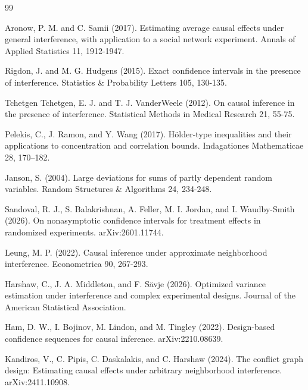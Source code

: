 \documentclass{article}
\begin{document}
\begin{thebibliography}{99}

   Aronow, P. M. and C. Samii (2017). Estimating average causal effects under general interference, with application to a social network experiment. Annals of Applied Statistics 11, 1912-1947.

   Rigdon, J. and M. G. Hudgens (2015). Exact confidence intervals in the presence of interference. Statistics \& Probability Letters 105, 130-135.

   Tchetgen Tchetgen, E. J. and T. J. VanderWeele (2012). On causal inference in the presence of interference. Statistical Methods in Medical Research 21, 55-75.

   Pelekis, C., J. Ramon, and Y. Wang (2017). Hölder-type inequalities and their applications to concentration and correlation bounds. Indagationes Mathematicae 28, 170--182.

   Janson, S. (2004). Large deviations for sums of partly dependent random variables. Random Structures \& Algorithms 24, 234-248.

   Sandoval, R. J., S. Balakrishnan, A. Feller, M. I. Jordan, and I. Waudby-Smith (2026). On nonasymptotic confidence intervals for treatment effects in randomized experiments. arXiv:2601.11744.

   Leung, M. P. (2022). Causal inference under approximate neighborhood interference. Econometrica 90, 267-293.

   Harshaw, C., J. A. Middleton, and F. Sävje (2026). Optimized variance estimation under interference and complex experimental designs. Journal of the American Statistical Association.

   Ham, D. W., I. Bojinov, M. Lindon, and M. Tingley (2022). Design-based confidence sequences for causal inference. arXiv:2210.08639.

   Kandiros, V., C. Pipis, C. Daskalakis, and C. Harshaw (2024). The conflict graph design: Estimating causal effects under arbitrary neighborhood interference. arXiv:2411.10908.

\end{thebibliography}
\end{document}

